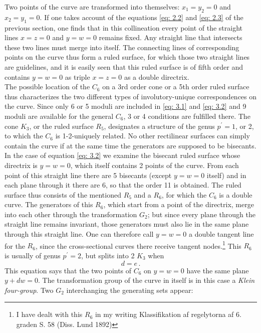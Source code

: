 \documentclass[leqno]{article}
\begin{document}
Two points of the curve are transformed into themselves: $x_1=y_2=0$ and $x_2=y_1=0$. If one takes account of the equations \eqref{eq: 2.2} and \eqref{eq: 2.3} of the previous section, one finds that in this collineation every point of the straight lines $x=z=0$ and $y=w=0$ remains fixed. Any straight line that intersects these two lines must merge into itself. The connecting lines of corresponding points on the curve thus form a ruled surface, for which those two straight lines are guidelines, and it is easily seen that this ruled surface is of fifth order and contains $y=w=0$ as triple $x=z=0 $ as a double directrix. \\
The possible location of the $C_6$ on a 3rd order cone or a 5th order ruled surface thus characterizes the two different types of involutory-unique correspondences on the curve. Since only 6 or 5 moduli are included in \eqref{eq: 3.1} and \eqref{eq: 3.2} and 9 moduli are available for the general $C_6$, 3 or 4 conditions are fulfilled there. The cone $K_3$, or the ruled surface $R_5$, designates a structure of the genus $p^\prime=1$, or 2, to which the $C_6$ is 1-2-uniquely related. No other rectilinear surfaces can simply contain the curve if at the same time the generators are supposed to be bisecants. \\
In the case of equation \eqref{eq: 3.2} we examine the bisecant ruled surface whose directrix is $y=w=0$, which itself contains 2 points of the curve. From each point of this straight line there are 5 bisecants (except $y=w=0$ itself) and in each plane through it there are 6, so that the order 11 is obtained. The ruled surface thus consists of the mentioned $R_5$ and a $R_6$, for which the $C_6$ is a double curve. The generators of this $R_6$, which start from a point of the directrix, merge into each other through the transformation $G_2$; but since every plane through the straight line remains invariant, those generators must also lie in the same plane through this straight line. One can therefore call $y=w=0$ a double tangent line for the $R_6$, since the cross-sectional curves there receive tangent nodes.\footnote{I have dealt with this $R_6$ in my writing \guillemotright Klassifikation af regelytorna af 6. graden \guillemotright S. 58 (Diss. Lund 1892)} This $R_6$ is usually of genus $p^\prime=2$, but splits into 2 $K_3$ when 
\begin{equation}\label{eq: 3.3}
d=e \, . \tag{3}
\end{equation}
This equation says that the two points of $C_6$ on $y=w=0$ have the same plane $y+dw=0$. The transformation group of the curve in itself is in this case a \textit{Klein four-group}. Two $G_2$ interchanging the generating sets appear:
\end{document}
